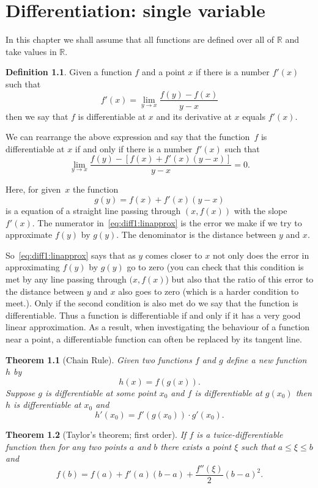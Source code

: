 \documentclass[11pt,reqno,openany]{amsbook}
\numberwithin{figure}{chapter}
\numberwithin{equation}{chapter}
\theoremstyle{plain}
\newtheorem{thm}{Theorem}[chapter]
\theoremstyle{definition}
\newtheorem{defn}{Definition}[chapter]
\renewcommand{\Re}{\mathbb{R}}
\begin{document}
\chapter{Differentiation: single variable}
In this chapter we shall assume that all functions are defined over
all of $\Re$ and take values in $\Re$.

\begin{defn}
  Given a function $f$ and a point $x$ if there is a
  number $f'(x)$ such that
  \[f'(x) = \lim_{y \to x} \frac{f(y)-f(x)}{y-x}\]
  then we say that $f$ is differentiable at $x$ and its derivative
  at $x$ equals $f'(x)$.
\end{defn}

We can rearrange the above expression and say that the
function~$f$ is differentiable at $x$ if and only if there is a
number $f'(x)$ such that 
\begin{equation}\label{eq:diff1:linapprox}
\lim_{y \to x} \frac{f(y)-[f(x)+f'(x)(y-x)]}{y-x}
=0.
\end{equation}

Here, for given~$x$ the function
\[g(y) = f(x)+f'(x)(y-x)\] is a equation of a straight line
passing through $(x,f(x))$ with the slope $f'(x)$. The
numerator in~\eqref{eq:diff1:linapprox} is the error we make
if we try to approximate $f(y)$ by $g(y)$. The denominator
is the distance between $y$ and
$x$. 

So~\eqref{eq:diff1:linapprox} says that as $y$ comes
closer to $x$ not only does the error in approximating
$f(y)$ by $g(y)$ go to zero (you can check that this
condition is met by any line passing through $(x,f(x)$)
but also that the ratio of this error to the distance
between $y$ and $x$ also goes to zero (which is a harder
condition to meet.). Only if the second condition is also met
do we say that the function is differentiable. Thus a
function is differentiable if and only if it has a very good
linear approximation. As a result, when investigating the
behaviour of a function near a point, a differentiable
function can often be replaced by its tangent line.

\begin{thm}[Chain Rule]
  Given two functions $f$ and $g$ define a new function $h$ by
  \[h(x)=f(g(x)).\]
  Suppose $g$ is differentiable at some point $x_0$ and $f$ is
  differentiable at $g(x_0)$ then $h$ is differentiable at $x_0$ and 
  \[h'(x_0) = f'(g(x_0))\cdot g'(x_0).\]
\end{thm}

\begin{thm}[Taylor's theorem; first order]
  If $f$ is a twice-differentiable function then for any two points
  $a$ and $b$ there exists a point $\xi$ such that $a \le \xi \le b$
  and
  \[f(b) = f(a) + f'(a)(b-a) + \frac{f''(\xi)}{2}(b-a)^2.\]
\end{thm}
\end{document}

